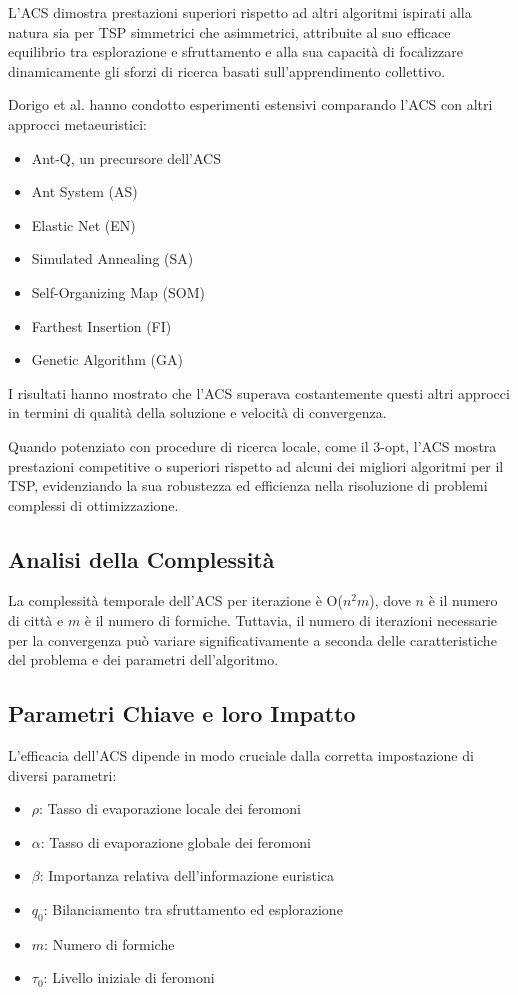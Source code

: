 L'\gls{ACS} dimostra prestazioni superiori rispetto ad altri algoritmi ispirati alla natura sia per \gls{TSP} simmetrici che asimmetrici, attribuite al suo efficace equilibrio tra esplorazione e sfruttamento e alla sua capacità di focalizzare dinamicamente gli sforzi di ricerca basati sull'apprendimento collettivo.

Dorigo et al. hanno condotto esperimenti estensivi comparando l'\gls{ACS} con altri approcci metaeuristici:

\begin{itemize}
	\item Ant-Q, un precursore dell'ACS
	\item Ant System (\gls{AS})
	\item Elastic Net (\gls{EN})
	\item Simulated Annealing (\gls{SA})
	\item Self-Organizing Map (SOM)
	\item Farthest Insertion (FI)
	\item Genetic Algorithm (\gls{GA})
\end{itemize}

I risultati hanno mostrato che l'\gls{ACS} superava costantemente questi altri approcci in termini di qualità della soluzione e velocità di convergenza.

Quando potenziato con procedure di ricerca locale, come il 3-opt, l'\gls{ACS} mostra prestazioni competitive o superiori rispetto ad alcuni dei migliori algoritmi per il \gls{TSP}, evidenziando la sua robustezza ed efficienza nella risoluzione di problemi complessi di ottimizzazione.

\subsection{Analisi della Complessità}
La complessità temporale dell'\gls{ACS} per iterazione è O($n^2m$), dove $n$ è il numero di città e $m$ è il numero di formiche. Tuttavia, il numero di iterazioni necessarie per la convergenza può variare significativamente a seconda delle caratteristiche del problema e dei parametri dell'algoritmo.

\subsection{Parametri Chiave e loro Impatto}
L'efficacia dell'\gls{ACS} dipende in modo cruciale dalla corretta impostazione di diversi parametri:

\begin{itemize}
	\item $\rho$: Tasso di evaporazione locale dei feromoni
	\item $\alpha$: Tasso di evaporazione globale dei feromoni
	\item $\beta$: Importanza relativa dell'informazione euristica
	\item $q_0$: Bilanciamento tra sfruttamento ed esplorazione
	\item $m$: Numero di formiche
	\item $\tau_0$: Livello iniziale di feromoni
\end{itemize}

